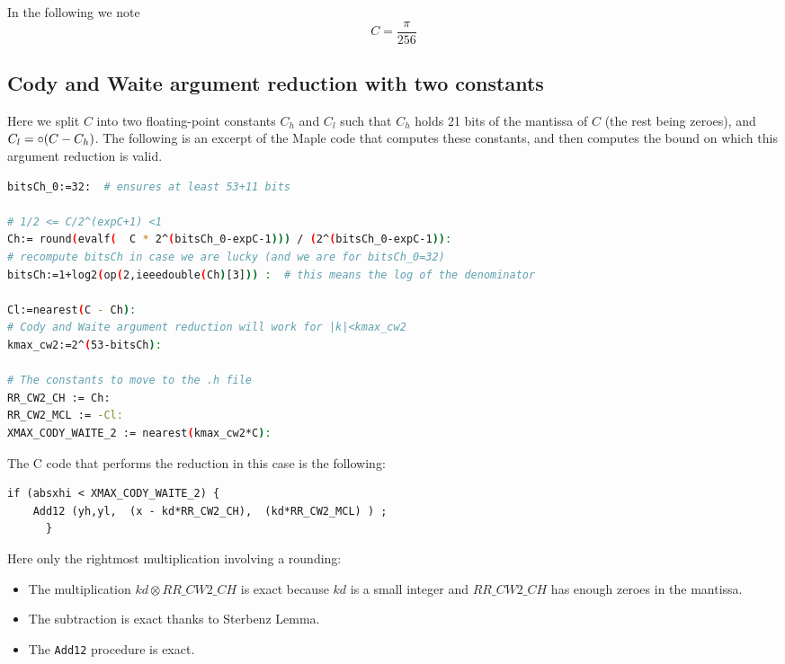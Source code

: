 In the following we note $$C=\frac{\pi}{256}$$

\subsection{Cody and Waite argument reduction with two constants}
Here we split $C$ into two floating-point constants $C_h$ and $C_l$
such that $C_h$ holds 21 bits of the mantissa of $C$ (the rest being
zeroes), and $C_l=\circ(C-C_h)$.  The following is an excerpt of the
Maple code that computes these constants, and then computes the
bound on which this argument reduction is valid.

\begin{lstlisting}[caption={Computing constants for Cody and Waite 2},
  firstnumber=1,  language={sh}]% of course it's maple
%Skip a line here, I don't know why, otherwise latex eats the first line
bitsCh_0:=32:  # ensures at least 53+11 bits

# 1/2 <= C/2^(expC+1) <1
Ch:= round(evalf(  C * 2^(bitsCh_0-expC-1))) / (2^(bitsCh_0-expC-1)):
# recompute bitsCh in case we are lucky (and we are for bitsCh_0=32)
bitsCh:=1+log2(op(2,ieeedouble(Ch)[3])) :  # this means the log of the denominator

Cl:=nearest(C - Ch):
# Cody and Waite argument reduction will work for |k|<kmax_cw2
kmax_cw2:=2^(53-bitsCh):

# The constants to move to the .h file
RR_CW2_CH := Ch:
RR_CW2_MCL := -Cl:
XMAX_CODY_WAITE_2 := nearest(kmax_cw2*C):
\end{lstlisting}

The C code that performs the reduction in this case is the following:

\begin{lstlisting}[caption={Cody and Waite argument reduction with two
    constants},firstnumber=1]
      if (absxhi < XMAX_CODY_WAITE_2) { 
	Add12 (yh,yl,  (x - kd*RR_CW2_CH),  (kd*RR_CW2_MCL) ) ;
      }
\end{lstlisting}

Here only the rightmost multiplication involving a rounding: 
\begin{itemize}
\item The multiplication $\mathit{kd}\otimes \mathit{RR\_CW2\_CH}$ is
  exact because $kd$ is a small integer and $\mathit{RR\_CW2\_CH}$
  has enough zeroes in the mantissa.
\item The subtraction is exact thanks to Sterbenz Lemma.
\item The \texttt{Add12} procedure is exact.
\end{itemize}

